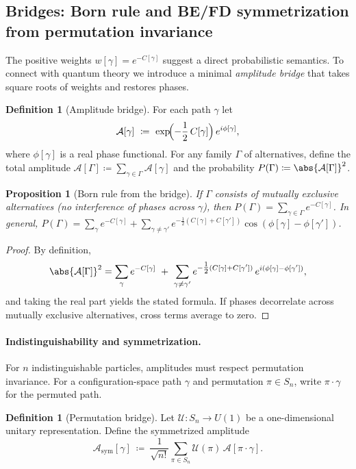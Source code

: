 \documentclass[12pt,a4paper]{article}
\newtheorem{proposition}[theorem]{Proposition}
\theoremstyle{definition}
\newtheorem{definition}[theorem]{Definition}
\theoremstyle{remark}
\begin{document}
\subsection{Bridges: Born rule and BE/FD symmetrization from permutation invariance}
\label{sec:bridge}

The positive weights $w[\gamma]=e^{-C[\gamma]}$ suggest a direct probabilistic semantics. To connect with quantum theory we introduce a minimal \emph{amplitude bridge} that takes square roots of weights and restores phases.

\begin{definition}[Amplitude bridge]
For each path \(\gamma\) let
\[
  \mathcal{A}[\gamma]\ \coloneqq\ \exp\!\Bigl(-\frac{1}{2}\,C[\gamma]\Bigr)\,e^{i\phi[\gamma]},
\]
where \(\phi[\gamma]\) is a real phase functional. For any family \(\Gamma\) of alternatives, define the total amplitude \(\mathcal{A}[\Gamma]\coloneqq \sum_{\gamma\in\Gamma}\mathcal{A}[\gamma]\) and the probability $P(\Gamma)\coloneqq \abs{\mathcal{A}[\Gamma]}^2$.
\end{definition}

\begin{proposition}[Born rule from the bridge]
\label{prop:born}
If \(\Gamma\) consists of mutually exclusive alternatives (no interference of phases across \(\gamma\)), then $P(\Gamma)=\sum_{\gamma\in\Gamma} e^{-C[\gamma]}$. In general, $P(\Gamma)=\sum_{\gamma} e^{-C[\gamma]} + \sum_{\gamma\neq\gamma'} e^{-\tfrac12(C[\gamma]+C[\gamma'])}\cos(\phi[\gamma]-\phi[\gamma'])$.
\end{proposition}

\begin{proof}
By definition,
\[
  \abs{\mathcal{A}[\Gamma]}^2=\sum_{\gamma} e^{-C[\gamma]} \ +\ \sum_{\gamma\neq\gamma'} e^{-\tfrac12(C[\gamma]+C[\gamma'])}\,e^{i(\phi[\gamma]-\phi[\gamma'])},
\]
and taking the real part yields the stated formula. If phases decorrelate across mutually exclusive alternatives, cross terms average to zero.
\end{proof}

\paragraph{Indistinguishability and symmetrization.} For $n$ indistinguishable particles, amplitudes must respect permutation invariance. For a configuration-space path \(\gamma\) and permutation \(\pi\in S_n\), write \(\pi\cdot\gamma\) for the permuted path.

\begin{definition}[Permutation bridge]
Let \(\mathcal{U}:S_n\to U(1)\) be a one-dimensional unitary representation. Define the symmetrized amplitude
\[
  \mathcal{A}_{\mathrm{sym}}[\gamma]\ \coloneqq\ \frac{1}{\sqrt{n!}}\sum_{\pi\in S_n}\mathcal{U}(\pi)\,\mathcal{A}[\pi\cdot\gamma].
\]
\end{definition}
\end{document}
